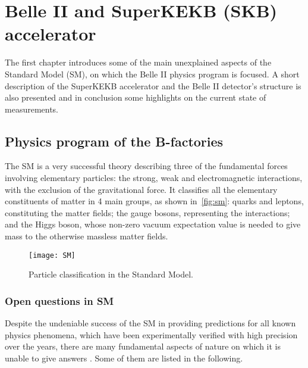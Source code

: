 
\chapter{Belle II and SuperKEKB (SKB) accelerator}\label{ch:BelleII}

The first chapter introduces some of the main unexplained aspects of the Standard Model (SM), on which the Belle II physics program is focused. A short description of the SuperKEKB accelerator and the Belle II detector's structure is also presented and in conclusion some highlights on the current state of measurements.


\section{Physics program of the B-factories}

The SM is a very successful theory describing three of the fundamental forces involving elementary particles: the strong, weak and electromagnetic interactions, with the exclusion of the gravitational force. It classifies all the elementary constituents of matter in 4 main groups, as shown in~\autoref{fig:sm}: quarks and leptons, constituting the matter fields; the gauge bosons, representing the interactions; and the Higgs boson, whose non-zero vacuum expectation value is needed to give mass to the otherwise massless matter fields.


\begin{figure}[h]
\centering
\texttt{[image: SM]}
\caption{Particle classification in the Standard Model.}
\label{fig:sm}
\end{figure}




\subsection{Open questions in SM}


Despite the undeniable success of the SM in providing predictions for all known physics phenomena, which have been experimentally verified with high precision over the years, there are many fundamental aspects of nature on which it is unable to give answers \cite{physics_book}. Some of them are listed in the following.

